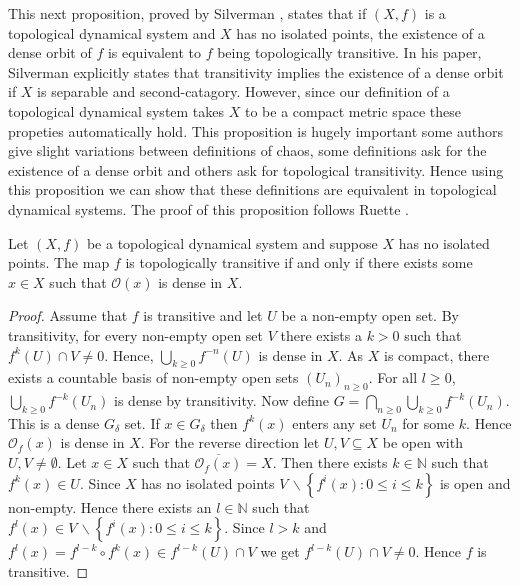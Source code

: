 This next proposition, proved by Silverman \cite{silverman}, states that if $(X, f)$ is a topological dynamical system and $X$ has no isolated points, the existence of a dense orbit of $f$ is equivalent to $f$ being topologically transitive. In his paper, Silverman explicitly states that transitivity implies the existence of a dense orbit if $X$ is separable and second-catagory. However, since our definition of a topological dynamical system takes $X$ to be a compact metric space these propeties automatically hold. This proposition is hugely important some authors give slight variations between definitions of chaos, some definitions ask for the existence of a dense orbit and others ask for topological transitivity. Hence using this proposition we can show that these definitions are equivalent in topological dynamical systems. The proof of this proposition follows Ruette \cite[\S 2.1]{ruette}.

\begin{prop} \label{prop:dense-transitive}
    Let $(X, f)$ be a topological dynamical system and suppose $X$ has no isolated points. The map $f$ is topologically transitive if and only if there exists some $x \in X$ such that $\mathcal{O}(x)$ is dense in $X$.
    \begin{proof}
        Assume that $f$ is transitive and let $U$ be a non-empty open set. By transitivity, for every non-empty open set $V$ there exists a $k > 0$ such that $f^k(U) \cap V \neq 0$. Hence, $\bigcup_{k \geq 0}f^{-n}(U)$ is dense in $X$. As $X$ is compact, there exists a countable basis of non-empty open sets $(U_n)_{n \geq 0}$. For all $l \geq 0$, $\bigcup_{k \geq 0}f^{-k}(U_n)$ is dense by transitivity. Now define $G = \bigcap_{n \geq 0}\bigcup_{k \geq 0}f^{-k}(U_n)$. This is a dense $G_\delta$ set. If $x \in G_\delta$ then $f^k(x)$ enters any set $U_n$ for some $k$. Hence $\mathcal{O}_f(x)$ is dense in $X$. For the reverse direction let $U, V \subseteq X$ be open with $U, V \neq \emptyset$. Let $x \in X$ such that $\overline{\mathcal{O}_f(x)} = X$. Then there exists $k \in \mathbb{N}$ such that $f^k(x) \in U$. Since $X$ has no isolated points $V\, \backslash \left\lbrace f^i(x) : 0 \leq i \leq k \right\rbrace$ is open and non-empty. Hence there exists an $l \in \mathbb{N}$ such that $f^l(x) \in V\, \backslash \left\lbrace f^i(x) : 0 \leq i \leq k \right\rbrace$. Since $l > k$ and $f^l(x) = f^{l - k} \circ f^{k}(x) \in f^{l - k}(U) \cap V$ we get $f^{l - k}(U) \cap V \neq 0$. Hence $f$ is transitive.
    \end{proof}
\end{prop}

